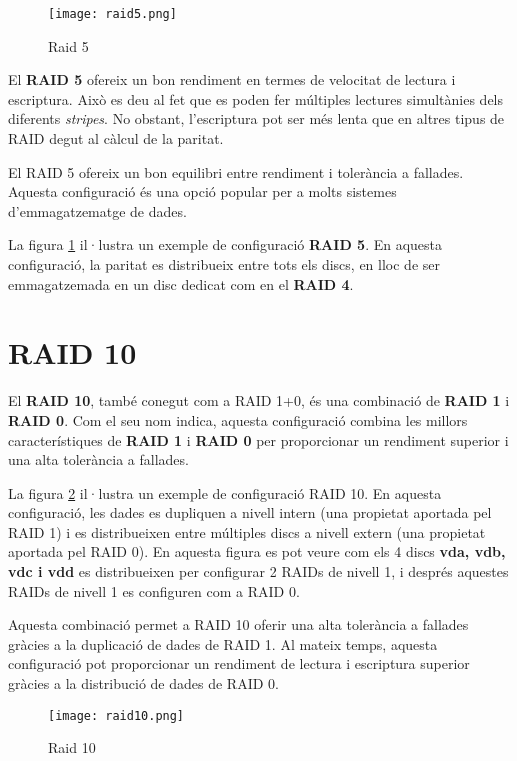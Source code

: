 \begin{figure}[!htb]
\centering
\texttt{[image: raid5.png]}
\caption{Raid 5}
\label{fig:raid5}
\end{figure}


El \textbf{RAID 5} ofereix un bon rendiment en termes de velocitat de lectura i escriptura. Això es deu al fet que es poden fer múltiples lectures simultànies dels diferents \emph{stripes}. No obstant, l'escriptura pot ser més lenta que en altres tipus de RAID degut al càlcul de la paritat. 

\begin{info}
El RAID 5 ofereix un bon equilibri entre rendiment i tolerància a fallades. Aquesta configuració és una opció popular per a molts sistemes d'emmagatzematge de dades.
\end{info}

La figura \ref{fig:raid5} il·lustra un exemple de configuració \textbf{RAID 5}. En aquesta configuració, la paritat es distribueix entre tots els discs, en lloc de ser emmagatzemada en un disc dedicat com en el \textbf{RAID 4}.



\section{RAID 10}\label{raid-10}
El \textbf{RAID 10}, també conegut com a RAID 1+0, és una combinació de \textbf{RAID 1} i \textbf{RAID 0}. Com el seu nom indica, aquesta configuració combina les millors característiques de \textbf{RAID 1} i \textbf{RAID 0} per proporcionar un rendiment superior i una alta tolerància a fallades.


La figura \ref{fig:raid10} il·lustra un exemple de configuració RAID 10. En aquesta configuració, les dades es dupliquen a nivell intern (una propietat aportada pel RAID 1) i es distribueixen entre múltiples discs a nivell extern (una propietat aportada pel RAID 0). En aquesta figura es pot veure com els 4 discs \textbf{vda, vdb, vdc i vdd} es distribueixen per configurar 2 RAIDs de nivell 1, i després aquestes RAIDs de nivell 1 es configuren com a RAID 0.

Aquesta combinació permet a RAID 10 oferir una alta tolerància a fallades gràcies a la duplicació de dades de RAID 1. Al mateix temps, aquesta configuració pot proporcionar un rendiment de lectura i escriptura superior gràcies a la distribució de dades de RAID 0. 


\begin{figure}[!htb]
\centering
\texttt{[image: raid10.png]}
\caption{Raid 10}
\label{fig:raid10}
\end{figure}

